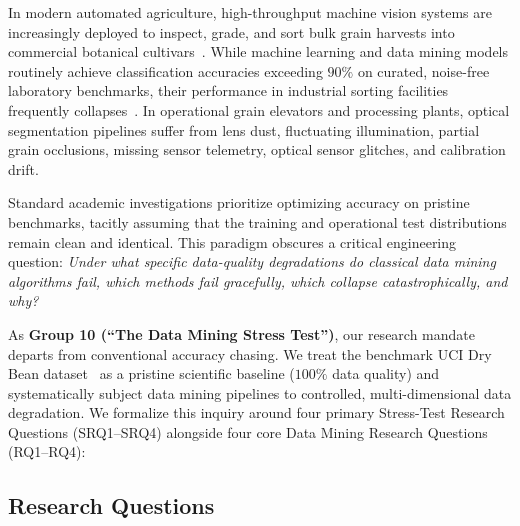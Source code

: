 \documentclass[11pt,a4paper]{article}
\begin{document}
In modern automated agriculture, high-throughput machine vision systems are increasingly deployed to inspect, grade, and sort bulk grain harvests into commercial botanical cultivars~\citep{koklu2020multiclass}. While machine learning and data mining models routinely achieve classification accuracies exceeding $90\%$ on curated, noise-free laboratory benchmarks, their performance in industrial sorting facilities frequently collapses~\citep{han2022datamining,tan2019introduction}. In operational grain elevators and processing plants, optical segmentation pipelines suffer from lens dust, fluctuating illumination, partial grain occlusions, missing sensor telemetry, optical sensor glitches, and calibration drift. 

Standard academic investigations prioritize optimizing accuracy on pristine benchmarks, tacitly assuming that the training and operational test distributions remain clean and identical. This paradigm obscures a critical engineering question: \textit{Under what specific data-quality degradations do classical data mining algorithms fail, which methods fail gracefully, which collapse catastrophically, and why?}

As \textbf{Group 10 (``The Data Mining Stress Test'')}, our research mandate departs from conventional accuracy chasing. We treat the benchmark UCI Dry Bean dataset~\citep{uci2020drybean,koklu2020multiclass} as a pristine scientific baseline ($100\%$ data quality) and systematically subject data mining pipelines to controlled, multi-dimensional data degradation. We formalize this inquiry around four primary Stress-Test Research Questions (SRQ1--SRQ4) alongside four core Data Mining Research Questions (RQ1--RQ4):

\subsection{Research Questions}
\label{subsec:research_questions}
\end{document}

